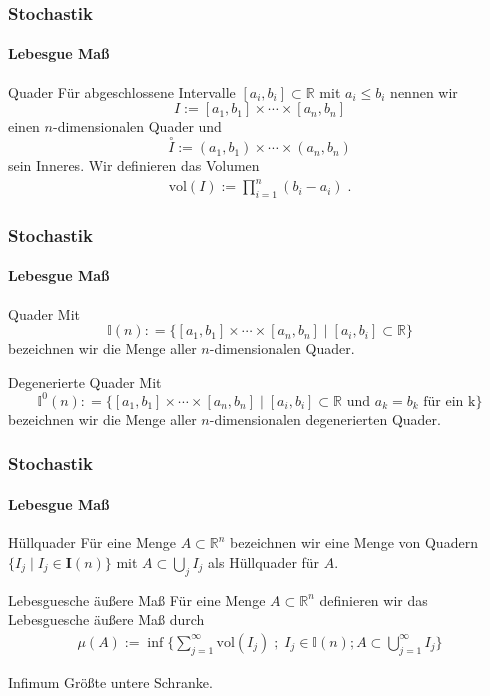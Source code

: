\documentclass{beamer}
\begin{document}
\begin{frame}
    \frametitle{Stochastik}
\framesubtitle{Lebesgue Maß}
    \begin{block}{Quader}
Für abgeschlossene Intervalle $[a_i,b_i] \subset \mathbb{R}$ mit $a_i \leq b_i$ nennen wir 
$$I := [a_1,b_1] \times \cdots \times [a_n,b_n]$$ 
einen $n$-dimensionalen Quader und 
$$\overset{\circ}{I}:= (a_1, b_1) \times \cdots \times (a_n,b_n)$$
 sein Inneres. Wir definieren das Volumen 
\begin{align*}
\text{vol} (I):=   \prod_{i = 1}^n (b_i -a_i)  \; .
\end{align*}

\end{block}
 \end{frame}

\begin{frame}
    \frametitle{Stochastik}
\framesubtitle{Lebesgue Maß}
    \begin{block}{Quader}
Mit $$\mathbb{I}(n): = \{   [a_1,b_1] \times \cdots \times [a_n,b_n] \; | \;  [a_i, b_i] \subset \mathbb{R} \}$$ bezeichnen wir die Menge aller $n$-dimensionalen Quader. 
\end{block}
    \begin{block}{Degenerierte Quader}
Mit $$\mathbb{I}^0(n): = \{   [a_1,b_1] \times \cdots \times [a_n,b_n] \; | \;  [a_i, b_i] \subset \mathbb{R}  \text { und } a_k = b_k \text{ für ein k}\}$$ bezeichnen wir die Menge aller $n$-dimensionalen degenerierten Quader. 
\end{block}
 
 \end{frame}



\begin{frame}
    \frametitle{Stochastik}
\framesubtitle{Lebesgue Maß}

    \begin{block}{Hüllquader}
Für eine Menge $A \subset \mathbb{R}^n$ bezeichnen wir eine Menge von Quadern $\{ I_j \; | \;  I_j \in \mathbf{I}(n)  \}$ mit $A \subset \bigcup_j I_j$ als Hüllquader für $A$.
\end{block}

    \begin{block}{ Lebesguesche äußere Maß}
Für eine Menge $A \subset \mathbb{R}^n$ definieren wir das Lebesguesche äußere Maß durch 
\begin{align*}
\mu (A):=   \inf \biggl \{ \sum_{j=1}^{\infty}   \text{vol} (I_j)\; ; \; I_j \in \mathbb{I}(n); A \subset \bigcup_{j= 1}^{\infty} I_j \biggr \} 
\end{align*}
\end{block}
    \begin{block}{Infimum}
Größte untere Schranke.
\end{block}
 \end{frame}
\end{document}
